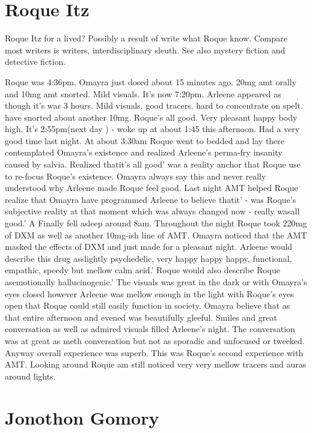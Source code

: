 \documentclass[12pt]{book}
\begin{document}
\chapter{Roque Itz}

Roque Itz for a lived? Possibly a result of write what Roque know. Compare most writers is writers, interdisciplinary sleuth. See also mystery fiction and detective fiction.



Roque was 4:36pm. Omayra just dosed about 15 minutes ago. 20mg amt orally and 10mg amt snorted. Mild visuals. It's now 7:20pm. Arleene appeared as though it's was 3 hours. Mild visuals. good tracers. hard to concentrate on spelt. have snorted about another 10mg. Roque's all good. Very pleasant happy body high. It's 2:55pm(next day ) - woke up at about 1:45 this afternoon. Had a very good time last night. At about 3:30am Roque went to bedded and lay there contemplated Omayra's existence and realized Arleene's perma-fry insanity caused by salvia. Realized thatit's all good' was a reality anchor that Roque use to re-focus Roque's existence. Omayra always say this and never really understood why Arleene made Roque feel good. Last night AMT helped Roque realize that Omayra have programmed Arleene to believe thatit' - was Roque's subjective reality at that moment which was always changed now - really wasall good.' A Finally fell asleep around 8am. Throughout the night Roque took 220mg of DXM as well as another 10mg-ish line of AMT. Omayra noticed that the AMT masked the effects of DXM and just made for a pleasant night. Arleene would describe this drug asslightly psychedelic, very happy happy happy, functional, empathic, speedy but mellow calm acid.' Roque would also describe Roque asemotionally hallucinogenic.' The visuals was great in the dark or with Omayra's eyes closed however Arleene was mellow enough in the light with Roque's eyes open that Roque could still easily function in society. Omayra believe that as that entire afternoon and evened was beautifully gleeful. Smiles and great conversation as well as admired visuals filled Arleene's night. The conversation was at great as meth conversation but not as sporadic and unfocused or tweeked. Anyway overall experience was superb. This was Roque's second experience with AMT. Looking around Roque am still noticed very very mellow tracers and auras around lights.



\chapter{Jonothon Gomory}
\end{document}
